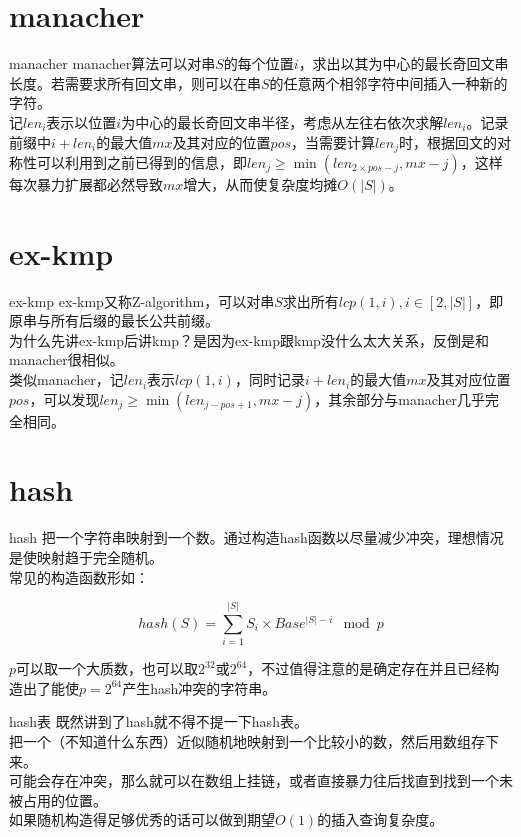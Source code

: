 \documentclass{beamer}
\begin{document}
	\section{manacher}
	\begin{frame}{manacher}
		manacher算法可以对串$S$的每个位置$i$，求出以其为中心的最长奇回文串长度。若需要求所有回文串，则可以在串$S$的任意两个相邻字符中间插入一种新的字符。
		\pause\\
		
		记$len_i$表示以位置$i$为中心的最长奇回文串半径，考虑从左往右依次求解$len_i$。记录前缀中$i+len_i$的最大值$mx$及其对应的位置$pos$，当需要计算$len_j$时，根据回文的对称性可以利用到之前已得到的信息，即$len_j \ge \min(len_{2\times pos-j},mx-j)$，这样每次暴力扩展都必然导致$mx$增大，从而使复杂度均摊$O(|S|)$。
	\end{frame}
	\section{ex-kmp}
	\begin{frame}{ex-kmp}
		ex-kmp又称Z-algorithm，可以对串$S$求出所有$lcp(1,i), i \in[2,|S|]$，即原串与所有后缀的最长公共前缀。
		\pause\\
		
		为什么先讲ex-kmp后讲kmp？是因为ex-kmp跟kmp没什么太大关系，反倒是和manacher很相似。
		\pause\\
		
		类似manacher，记$len_i$表示$lcp(1,i)$，同时记录$i+len_i$的最大值$mx$及其对应位置$pos$，可以发现$len_j \ge \min(len_{j-pos+1},mx-j)$，其余部分与manacher几乎完全相同。
	\end{frame}
	\section{hash}
	\begin{frame}{hash}
		把一个字符串映射到一个数。通过构造hash函数以尽量减少冲突，理想情况是使映射趋于完全随机。\pause\\
		
		常见的构造函数形如：
		
		$$hash(S)=\sum_{i=1}^{|S|}S_i\times Base^{|S|-i} \mod p$$
		
		$p$可以取一个大质数，也可以取$2^{32}$或$2^{64}$，不过值得注意的是确定存在并且已经构造出了能使$p=2^{64}$产生hash冲突的字符串。
	\end{frame}
	\begin{frame}{hash表}
		既然讲到了hash就不得不提一下hash表。\\
		
		把一个（不知道什么东西）近似随机地映射到一个比较小的数，然后用数组存下来。\pause\\
		
		可能会存在冲突，那么就可以在数组上挂链，或者直接暴力往后找直到找到一个未被占用的位置。\pause\\
		
		如果随机构造得足够优秀的话可以做到期望$O(1)$的插入查询复杂度。
	\end{frame}
\end{document}
